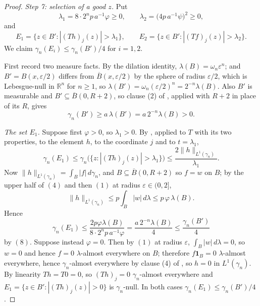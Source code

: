 \begin{proof}
\emph{Step 7: selection of a good $z$.}
Put
\[
  \lambda_1 = 8\cdot2^np\,a^{-1}\varphi \geq 0,
  \qquad
  \lambda_2 = \bigl(4p\,a^{-1}\psi\bigr)^2 \geq 0 ,
\]
and
\[
  E_1 = \{z \in B' : |(Th)_j(z)| > \lambda_1\},
  \qquad
  E_2 = \{z \in B' : |(Tf)_j(z)| > \lambda_2\} .
\]
We claim $\gamma_n(E_i) \leq \gamma_n(B')/4$ for $i = 1,2$.

First record two measure facts.  By the dilation identity,
$\lambda(B) = \omega_n\varepsilon^n$; and $B' = B(x,\varepsilon/2)$ differs
from $\overline B(x,\varepsilon/2)$ by the sphere of radius $\varepsilon/2$,
which is Lebesgue-null in $\mathbb{R}^n$ for $n \geq 1$, so
$\lambda(B') = \omega_n(\varepsilon/2)^n = 2^{-n}\lambda(B)$.  Also $B'$ is
measurable and $B' \subseteq \overline B(0,R+2)$, so clause (2) of
, applied with $R+2$ in place of its $R$,
gives
\begin{equation*}
  \gamma_n(B') \geq a\,\lambda(B') = a\,2^{-n}\lambda(B) > 0 . \tag{8}
\end{equation*}

\emph{The set $E_1$.}  Suppose first $\varphi > 0$, so $\lambda_1 > 0$.  By
, applied to $T$ with its two properties, to
the element $h$, to the coordinate $j$ and to $t = \lambda_1$,
\[
  \gamma_n(E_1) \leq \gamma_n\bigl(\{z : |(Th)_j(z)| > \lambda_1\}\bigr)
    \leq \frac{2\|h\|_{L^1(\gamma_n)}}{\lambda_1} .
\]
Now $\|h\|_{L^1(\gamma_n)} = \int_B|f|\,d\gamma_n$, and $B \subseteq
\overline B(0,R+2)$ so $f = w$ on $B$; by the upper half of $(4)$ and then
$(1)$ at radius $\varepsilon \in (0,2]$,
\[
  \|h\|_{L^1(\gamma_n)} \leq p\int_B|w|\,d\lambda \leq p\,\varphi\,\lambda(B) .
\]
Hence
\[
  \gamma_n(E_1) \leq \frac{2p\varphi\lambda(B)}{8\cdot2^np\,a^{-1}\varphi}
    = \frac{a\,2^{-n}\lambda(B)}{4} \leq \frac{\gamma_n(B')}{4}
\]
by $(8)$.  Suppose instead $\varphi = 0$.  Then by $(1)$ at radius
$\varepsilon$, $\int_B|w|\,d\lambda = 0$, so $w = 0$ and hence $f = 0$
$\lambda$-almost everywhere on $B$; therefore $f\mathbf 1_B = 0$
$\lambda$-almost everywhere, hence $\gamma_n$-almost everywhere by clause (4)
of , so $h = 0$ in $L^1(\gamma_n)$.  By
linearity $Th = T0 = 0$, so $(Th)_j = 0$ $\gamma_n$-almost everywhere and
$E_1 = \{z \in B' : |(Th)_j(z)| > 0\}$ is $\gamma_n$-null.  In both cases
$\gamma_n(E_1) \leq \gamma_n(B')/4$.


\end{proof}
